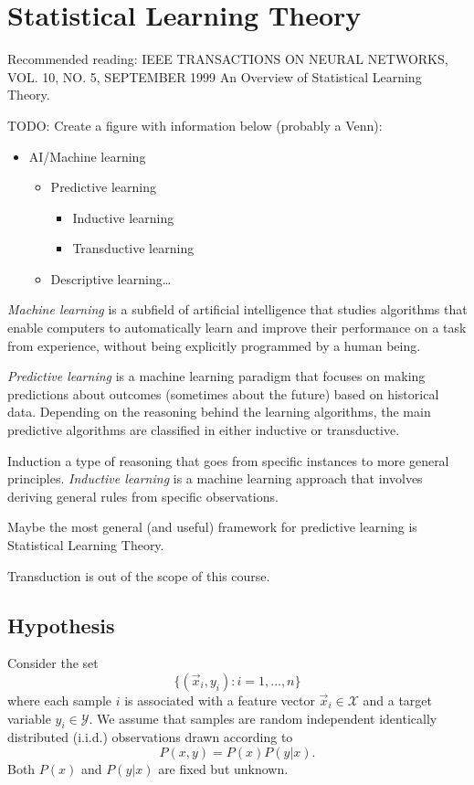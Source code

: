 \chapter{Statistical Learning Theory}

Recommended reading: IEEE TRANSACTIONS ON NEURAL NETWORKS, VOL. 10, NO. 5, SEPTEMBER 1999
An Overview of Statistical Learning Theory.

TODO: Create a figure with information below (probably a Venn):
\begin{itemize}
  \item AI/Machine learning
  \begin{itemize}
    \item Predictive learning
    \begin{itemize}
      \item Inductive learning
      \item Transductive learning
    \end{itemize}
    \item Descriptive learning\dots
  \end{itemize}
\end{itemize}

\emph{Machine learning} is a subfield of artificial intelligence that studies algorithms
that enable computers to automatically learn and improve their performance on a task from
experience, without being explicitly programmed by a human being.

\emph{Predictive learning} is a machine learning paradigm that focuses on making
predictions about outcomes (sometimes about the future) based on historical data.
Depending on the reasoning behind the learning algorithms, the main predictive algorithms
are classified in either inductive or transductive.

Induction a type of reasoning that goes from specific instances to more general
principles. \emph{Inductive learning} is a machine learning approach that involves deriving
general rules from specific observations.

Maybe the most general (and useful) framework for predictive learning is Statistical
Learning Theory.

Transduction is out of the scope of this course.

\section{Hypothesis}

Consider the set
\begin{equation}
  \label{eq:training-set}
  \big\{(\vec{x}_i, y_i) : i = 1, \dots, n \big\}
\end{equation}
where each sample $i$ is associated with a feature vector $\vec{x}_i \in \mathcal{X}$ and a target variable
$y_i \in \mathcal{Y}$.  We assume that samples are random independent identically
distributed (i.i.d.) observations drawn according to $$P(x, y) = P(x) P(y | x)\text{.}$$
Both $P(x)$ and $P(y|x)$ are fixed but unknown.

